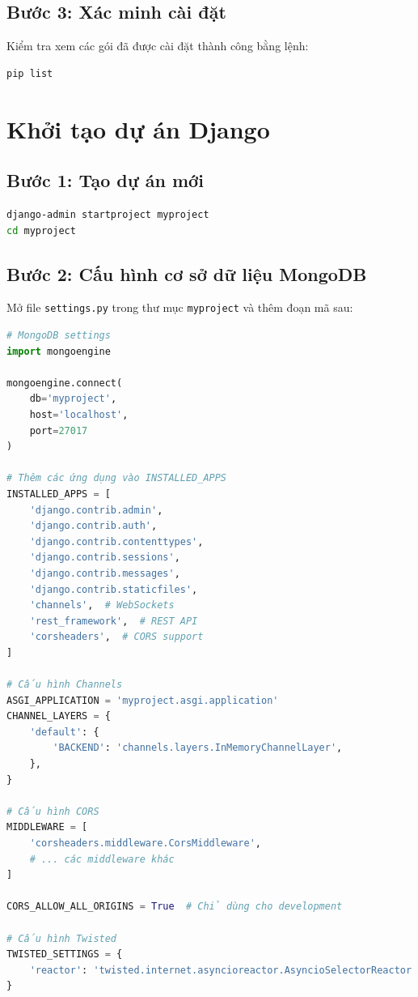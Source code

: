 \subsection{Bước 3: Xác minh cài đặt}

Kiểm tra xem các gói đã được cài đặt thành công bằng lệnh:

\begin{lstlisting}[language=bash]
pip list
\end{lstlisting}

\section{Khởi tạo dự án Django}

\subsection{Bước 1: Tạo dự án mới}

\begin{lstlisting}[language=bash]
django-admin startproject myproject
cd myproject
\end{lstlisting}

\subsection{Bước 2: Cấu hình cơ sở dữ liệu MongoDB}

Mở file \texttt{settings.py} trong thư mục \texttt{myproject} và thêm đoạn mã sau:

\begin{lstlisting}[language=python]
# MongoDB settings
import mongoengine

mongoengine.connect(
    db='myproject',
    host='localhost',
    port=27017
)

# Thêm các ứng dụng vào INSTALLED_APPS
INSTALLED_APPS = [
    'django.contrib.admin',
    'django.contrib.auth',
    'django.contrib.contenttypes',
    'django.contrib.sessions',
    'django.contrib.messages',
    'django.contrib.staticfiles',
    'channels',  # WebSockets
    'rest_framework',  # REST API
    'corsheaders',  # CORS support
]

# Cấu hình Channels
ASGI_APPLICATION = 'myproject.asgi.application'
CHANNEL_LAYERS = {
    'default': {
        'BACKEND': 'channels.layers.InMemoryChannelLayer',
    },
}

# Cấu hình CORS
MIDDLEWARE = [
    'corsheaders.middleware.CorsMiddleware',
    # ... các middleware khác
]

CORS_ALLOW_ALL_ORIGINS = True  # Chỉ dùng cho development

# Cấu hình Twisted
TWISTED_SETTINGS = {
    'reactor': 'twisted.internet.asyncioreactor.AsyncioSelectorReactor',
}
\end{lstlisting}

